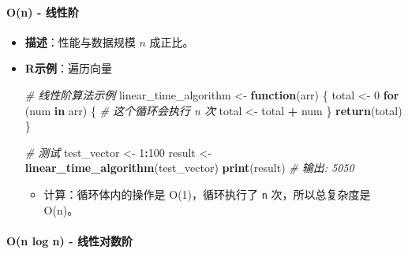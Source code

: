 \documentclass[
  twoside]{book}
\newenvironment{Shaded}{\begin{snugshade}}{\end{snugshade}}
\newcommand{\CommentTok}[1]{\textcolor[rgb]{0.56,0.35,0.01}{\textit{#1}}}
\newcommand{\ControlFlowTok}[1]{\textcolor[rgb]{0.13,0.29,0.53}{\textbf{#1}}}
\newcommand{\DecValTok}[1]{\textcolor[rgb]{0.00,0.00,0.81}{#1}}
\newcommand{\FunctionTok}[1]{\textcolor[rgb]{0.13,0.29,0.53}{\textbf{#1}}}
\newcommand{\NormalTok}[1]{#1}
\newcommand{\OtherTok}[1]{\textcolor[rgb]{0.56,0.35,0.01}{#1}}
\newcommand{\SpecialCharTok}[1]{\textcolor[rgb]{0.81,0.36,0.00}{\textbf{#1}}}
\providecommand{\tightlist}{%
  \setlength{\itemsep}{0pt}\setlength{\parskip}{0pt}}
\begin{document}
\hypertarget{on---ux7ebfux6027ux9636}{%
\paragraph{O(n) - 线性阶}\label{on---ux7ebfux6027ux9636}}

\begin{itemize}
\item
  \textbf{描述}：性能与数据规模 \(n\) 成正比。
\item
  \textbf{R示例}：遍历向量

\begin{Shaded}
\begin{Highlighting}[]
\CommentTok{\# 线性阶算法示例}
\NormalTok{linear\_time\_algorithm }\OtherTok{\textless{}{-}} \ControlFlowTok{function}\NormalTok{(arr) \{}
\NormalTok{  total }\OtherTok{\textless{}{-}} \DecValTok{0}
  \ControlFlowTok{for}\NormalTok{ (num }\ControlFlowTok{in}\NormalTok{ arr) \{  }\CommentTok{\# 这个循环会执行 n 次}
\NormalTok{    total }\OtherTok{\textless{}{-}}\NormalTok{ total }\SpecialCharTok{+}\NormalTok{ num}
\NormalTok{  \}}
  \FunctionTok{return}\NormalTok{(total)}
\NormalTok{\}}

\CommentTok{\# 测试}
\NormalTok{test\_vector }\OtherTok{\textless{}{-}} \DecValTok{1}\SpecialCharTok{:}\DecValTok{100}
\NormalTok{result }\OtherTok{\textless{}{-}} \FunctionTok{linear\_time\_algorithm}\NormalTok{(test\_vector)}
\FunctionTok{print}\NormalTok{(result)  }\CommentTok{\# 输出: 5050}
\end{Highlighting}
\end{Shaded}

  \begin{itemize}
  \tightlist
  \item
    计算：循环体内的操作是 O(1)，循环执行了 \texttt{n} 次，所以总复杂度是 O(n)。
  \end{itemize}
\end{itemize}

\hypertarget{on-log-n---ux7ebfux6027ux5bf9ux6570ux9636}{%
\paragraph{O(n log n) - 线性对数阶}\label{on-log-n---ux7ebfux6027ux5bf9ux6570ux9636}}
\end{document}
